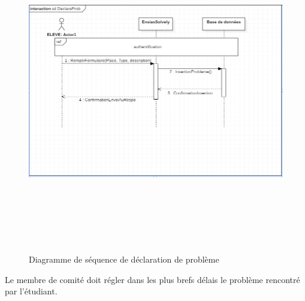\documentclass[11.5pt]{report}
\begin{document}
\begin{figure}[h]
	
	\begin{center}
		\includegraphics[width=400pt,height=400pt]{seq2.png} 
		\caption{Diagramme de séquence de déclaration de problème}
	\end{center}
	
\end{figure}
\newpage
Le membre de comité doit régler dans les plus brefs délais le problème rencontré par l’étudiant.\\
\end{document}
